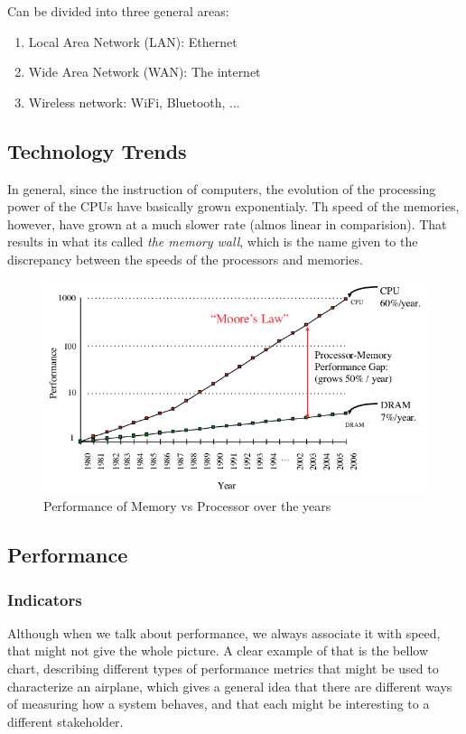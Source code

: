 \documentclass{article}
\begin{document}
Can be divided into three general areas:
\begin{enumerate}
    \item Local Area Network (LAN): Ethernet
    \item Wide Area Network (WAN): The internet
    \item Wireless network: WiFi, Bluetooth, ...
\end{enumerate}

\subsection{Technology Trends}
In general, since the instruction of computers, the evolution of the processing power of the CPUs have basically grown exponentialy. Th speed of the memories, however, have grown at a much slower rate (almos linear in comparision). That results in what its called \emph{the memory wall}, which is the name given to the discrepancy between the speeds of the processors and memories.

\begin{figure}[h]
    \centering
    \includegraphics[width=.8\textwidth]{imgs/Memory-Access-vs-CPU-Speed.png}
    \caption{Performance of Memory vs Processor over the years}
\end{figure}

\subsection{Performance}
\subsubsection{Indicators}
Although when we talk about performance, we always associate it with speed, that might not give the whole picture. A clear example of that is the bellow chart, describing different types of performance metrics that might be used to characterize an airplane, which gives a general idea that there are different ways of measuring how a system behaves, and that each might be interesting to a different stakeholder.
\end{document}
